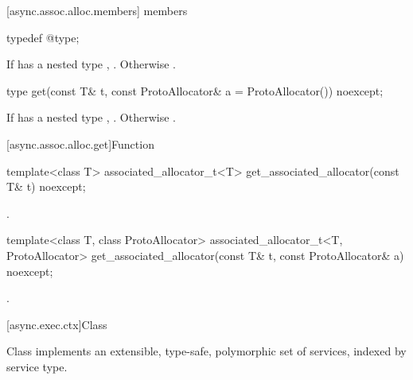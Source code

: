 [async.assoc.alloc.members]{ members}

\begin{itemdecl}
typedef @\seebelow@ type;
\end{itemdecl}

\begin{itemdescr}
\pnum
\ctype If  has a nested type , . Otherwise .
\end{itemdescr}

\begin{itemdecl}
type get(const T& t, const ProtoAllocator& a = ProtoAllocator()) noexcept;
\end{itemdecl}

\begin{itemdescr}
\pnum
\returns If  has a nested type , . Otherwise .
\end{itemdescr}




[async.assoc.alloc.get]{Function }

\begin{itemdecl}
template<class T>
  associated_allocator_t<T> get_associated_allocator(const T& t) noexcept;
\end{itemdecl}

\begin{itemdescr}
\pnum
\returns {}.
\end{itemdescr}

\begin{itemdecl}
template<class T, class ProtoAllocator>
  associated_allocator_t<T, ProtoAllocator>
    get_associated_allocator(const T& t, const ProtoAllocator& a) noexcept;
\end{itemdecl}

\begin{itemdescr}
\pnum
\returns {}.
\end{itemdescr}



[async.exec.ctx]{Class }

\pnum
Class  implements an extensible, type-safe, polymorphic set of services, indexed by service type.

